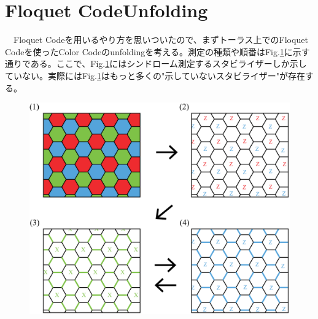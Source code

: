 \documentclass[a4paper,10pt]{ltjsarticle}
\begin{document}
\section{Floquet Code\times Unfolding}\label{floquet_code}{
    　Floquet Codeを用いるやり方を思いついたので、まずトーラス上でのFloquet Codeを使ったColor Codeのunfoldingを考える。測定の種類や順番はFig.\ref{figure6}に示す通りである。ここで、Fig.\ref{figure6}にはシンドローム測定するスタビライザーしか示していない。実際にはFig.\ref{figure6}はもっと多くの"示していないスタビライザー"が存在する。

    \begin{figure}[h]
        \centering
        \includegraphics[scale=0.3]{figure/figure6.eps}
        \caption{ }
        \label{figure6}
    \end{figure}

}
\end{document}
